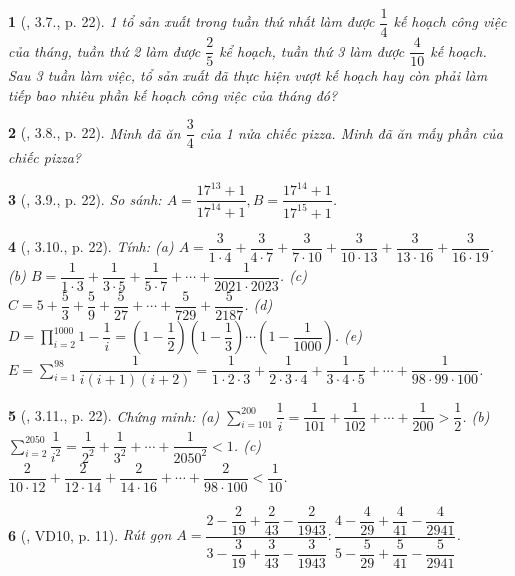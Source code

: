 \documentclass{article}
\newtheorem{baitoan}{}
\begin{document}
\begin{baitoan}[\cite{Binh_boi_duong_Toan_6_tap_2}, 3.7., p. 22]
	1 tổ sản xuất trong tuần thứ nhất làm được $\dfrac{1}{4}$ kế hoạch công việc của tháng, tuần thứ 2 làm được $\dfrac{2}{5}$ kể hoạch, tuần thứ 3 làm được $\dfrac{4}{10}$ kế hoạch. Sau 3 tuần làm việc, tổ sản xuất đã thực hiện vượt kế hoạch hay còn phải làm tiếp bao nhiêu phần kế hoạch công việc của tháng đó?
\end{baitoan}

\begin{baitoan}[\cite{Binh_boi_duong_Toan_6_tap_2}, 3.8., p. 22]
	Minh đã ăn $\dfrac{3}{4}$ của 1 nửa chiếc pizza. Minh đã ăn mấy phần của chiếc pizza?
\end{baitoan}

\begin{baitoan}[\cite{Binh_boi_duong_Toan_6_tap_2}, 3.9., p. 22]
	So sánh: $A = \dfrac{17^{13} + 1}{17^{14} + 1},B = \dfrac{17^{14} + 1}{17^{15} + 1}$.
\end{baitoan}

\begin{baitoan}[\cite{Binh_boi_duong_Toan_6_tap_2}, 3.10., p. 22]
	Tính: (a) $A = \dfrac{3}{1\cdot4} + \dfrac{3}{4\cdot7} + \dfrac{3}{7\cdot10} + \dfrac{3}{10\cdot13} + \dfrac{3}{13\cdot16} + \dfrac{3}{16\cdot19}$. (b) $B = \dfrac{1}{1\cdot3} + \dfrac{1}{3\cdot5} + \dfrac{1}{5\cdot7} + \cdots + \dfrac{1}{2021\cdot2023}$. (c) $C = 5 + \dfrac{5}{3} + \dfrac{5}{9} + \dfrac{5}{27} + \cdots + \dfrac{5}{729} + \dfrac{5}{2187}$. (d) $D = \prod_{i=2}^{1000} 1 - \dfrac{1}{i} = \left(1 - \dfrac{1}{2}\right)\left(1 - \dfrac{1}{3}\right)\cdots\left(1 - \dfrac{1}{1000}\right)$. (e) $E = \sum_{i=1}^{98} \dfrac{1}{i(i + 1)(i + 2)} = \dfrac{1}{1\cdot2\cdot3} + \dfrac{1}{2\cdot3\cdot4} + \dfrac{1}{3\cdot4\cdot5} + \cdots + \dfrac{1}{98\cdot99\cdot100}$.
\end{baitoan}

\begin{baitoan}[\cite{Binh_boi_duong_Toan_6_tap_2}, 3.11., p. 22]
	Chứng minh: (a) $\sum_{i=101}^{200} \dfrac{1}{i} = \dfrac{1}{101} + \dfrac{1}{102} + \cdots + \dfrac{1}{200} > \dfrac{1}{2}$. (b) $\sum_{i=2}^{2050} \dfrac{1}{i^2} = \dfrac{1}{2^2} + \dfrac{1}{3^2} + \cdots + \dfrac{1}{2050^2} < 1$. (c) $\dfrac{2}{10\cdot12} + \dfrac{2}{12\cdot14} + \dfrac{2}{14\cdot16} + \cdots + \dfrac{2}{98\cdot100} < \dfrac{1}{10}$.
\end{baitoan}

\begin{baitoan}[\cite{Binh_Toan_6_tap_2}, VD10, p. 11]
	Rút gọn $A = \dfrac{2 - \dfrac{2}{19} + \dfrac{2}{43} - \dfrac{2}{1943}}{3 - \dfrac{3}{19} + \dfrac{3}{43} - \dfrac{3}{1943}}:\dfrac{4 - \dfrac{4}{29} + \dfrac{4}{41} - \dfrac{4}{2941}}{5 - \dfrac{5}{29} + \dfrac{5}{41} - \dfrac{5}{2941}}$.
\end{baitoan}
\end{document}
